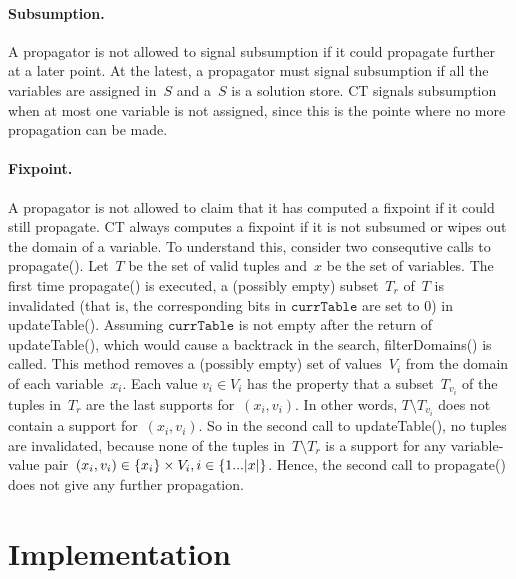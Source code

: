 \documentclass[a4paper,11pt]{article}
\newcommand{\CurrTable}{\texttt{currTable}}
\numberwithin{equation}{section}
\begin{document}
\paragraph{Subsumption.}
A propagator is not allowed to signal subsumption if it could propagate further
at a later point. At the latest, a propagator must signal subsumption if all the variables
are assigned in~$S$ and a~$S$ is a solution store.
CT signals subsumption when at most one variable is not assigned,
since this is the pointe where no more propagation can be made.

\paragraph{Fixpoint.}
A propagator is not allowed to claim that it has computed a fixpoint if
it could still propagate.
CT always computes a fixpoint if it is not subsumed or wipes out the domain of a variable.
To understand this, consider two consequtive calls to propagate().
Let~$T$ be the set of valid tuples and~$x$ be the set of variables.
The first time propagate() is executed, a (possibly empty) subset~$T_r$ of~$T$
is invalidated (that is, the corresponding bits in $\CurrTable$ are set to $0$)
in updateTable().
Assuming $\CurrTable$ is not empty after the return of updateTable(), which would
cause a backtrack in the search, filterDomains() is called.
This method removes a (possibly empty) set of values~$V_i$ from the domain 
of each variable~$x_i$.
Each value $v_i \in V_i$ has the property that a subset~$T_{v_i}$ 
of the tuples in~$T_r$ are the last supports for~$(x_i,v_i)$. In other words,
$T \setminus T_{v_i}$ does not contain a support for~$(x_i,v_i)$.
So in the second call to updateTable(), no tuples are invalidated,
because none of the tuples in~$T \setminus T_r$ is a support for any variable-value
pair~$(x_i, v_i) \in \left\{x_i\right\} \times V_i, i \in \left\{1...|x|\right\}$.
Hence, the second call to propagate() does not give
any further propagation.

\section{Implementation}
\label{implementation}

\end{document}
